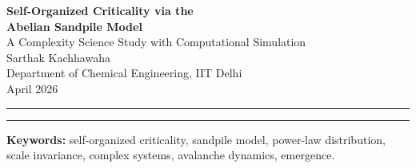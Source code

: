 \documentclass[12pt,a4paper]{article}
\begin{document}
\begin{center}
  {\LARGE\bfseries Self-Organized Criticality via the\\[4pt]
   Abelian Sandpile Model}\\[10pt]
  {\large A Complexity Science Study with Computational Simulation}\\[14pt]
  {\large Sarthak Kachhawaha}\\[2pt]
  {\normalsize Department of Chemical Engineering, IIT Delhi}\\[2pt]
  {\normalsize April 2026}
\end{center}

\noindent\rule{\linewidth}{0.4pt}

\begin{abstract}
\noindent
This paper presents a comprehensive investigation of the Abelian sandpile model as a
paradigmatic system exhibiting self-organized criticality (SOC).  A computational
simulation is implemented in Python on a $50\times50$ two-dimensional lattice to model
grain addition and threshold-driven redistribution dynamics.  Over $10^5$ grain drops,
the system evolves through local interactions and produces avalanche events spanning
more than four decades in size.  Statistical analysis of the avalanche size distribution
reveals a power-law $P(s)\propto s^{-\alpha}$ with exponent $\alpha\approx1.4$--$1.6$,
confirmed by maximum-likelihood estimation (MLE) and ordinary least-squares (OLS) regression
on log-binned probability densities ($R^2=0.90$).  Complementary cumulative distribution
functions, temporal evolution plots, and final-state heatmaps collectively demonstrate
scale invariance and criticality without external parameter tuning.  The findings illustrate
how simple microscopic threshold rules give rise to complex, scale-free macroscopic
behaviour, with implications for modelling earthquakes, financial markets, neural activity,
and other natural and engineered systems that exhibit cascading dynamics.
\end{abstract}

\noindent\rule{\linewidth}{0.4pt}
\vspace{4pt}

\noindent\textbf{Keywords:} self-organized criticality, sandpile model, power-law distribution,
scale invariance, complex systems, avalanche dynamics, emergence.

\vspace{8pt}
\end{document}
